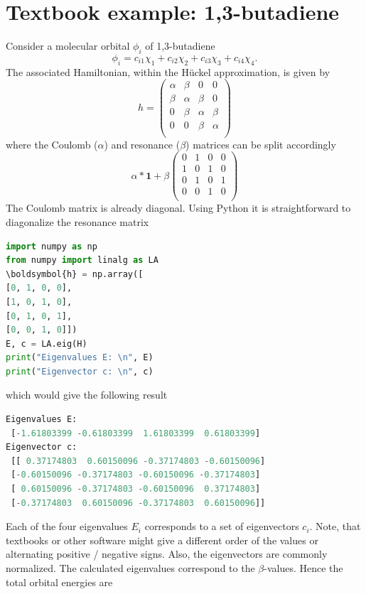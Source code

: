 \documentclass{article}
\begin{document}
\section*{Textbook example: 1,3-butadiene}
Consider a molecular orbital $\phi_i$ of 1,3-butadiene
%
\begin{equation}
\phi_i = c_{i1}\chi_1 + c_{i2}\chi_2 + c_{i3}\chi_3 + c_{i4}\chi_4.
\end{equation} 
%
The associated Hamiltonian, within the H\"uckel approximation, is given by
%
\begin{equation}
h =
\begin{pmatrix}
\alpha & \beta & 0 & 0 \\
\beta & \alpha & \beta & 0  \\
0 & \beta & \alpha & \beta  \\
0 & 0 & \beta & \alpha \\
\end{pmatrix}
\end{equation}
%
where the Coulomb ($\alpha$) and resonance ($\beta$) matrices can be split accordingly
%
\begin{equation}
\alpha * \boldsymbol{1} + \beta
\begin{pmatrix}
0 & 1 & 0 & 0 \\
1 & 0 & 1 & 0 \\
0 & 1 & 0 & 1 \\
0 & 0 & 1 & 0 \\
\end{pmatrix}
\end{equation}
%
The Coulomb matrix is already diagonal. Using Python it is straightforward to diagonalize the resonance matrix
%
\begin{lstlisting}[language=Python,label={lst:python_butadiene}]
import numpy as np
from numpy import linalg as LA
\boldsymbol{h} = np.array([
[0, 1, 0, 0],
[1, 0, 1, 0],
[0, 1, 0, 1],
[0, 0, 1, 0]])
E, c = LA.eig(H)
print("Eigenvalues E: \n", E)
print("Eigenvector c: \n", c)
\end{lstlisting}
%
which would give the following result
%
\begin{lstlisting}[language=Python]
Eigenvalues E: 
 [-1.61803399 -0.61803399  1.61803399  0.61803399]
Eigenvector c: 
 [[ 0.37174803  0.60150096 -0.37174803 -0.60150096]
 [-0.60150096 -0.37174803 -0.60150096 -0.37174803]
 [ 0.60150096 -0.37174803 -0.60150096  0.37174803]
 [-0.37174803  0.60150096 -0.37174803  0.60150096]]
\end{lstlisting}
%
Each of the four eigenvalues $E_i$ corresponds to a set of eigenvectors $c_i$. Note, that textbooks or other software might give a different order of the values or alternating positive / negative signs. Also, the eigenvectors are commonly normalized. The calculated eigenvalues correspond to the $\beta$-values. Hence the total orbital energies are
\end{document}
